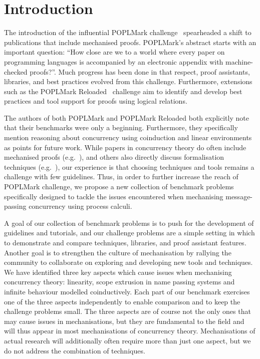 \documentclass[runningheads]{llncs}
\begin{document}
\section{Introduction}


The introduction of the influential POPLMark challenge~\cite{POPLMark}
spearheaded a shift to publications that include mechanised proofs.
POPLMark's abstract starts with an important question: ``How close are
we to a world where every paper on programming languages is
accompanied by an electronic appendix with machine- checked proofs?''.
Much progress has been done in that respect, proof assistants,
libraries, and best practices evolved from this challenge.
Furthermore, extensions such as the POPLMark
Reloaded~\cite{POPLMarkReloaded} challenge aim to identify and develop
best practices and tool support for proofs using logical relations.

The authors of both POPLMark and POPLMark Reloaded both explicitly
note that their benchmarks were only a beginning. Furthermore, they
specifically mention reasoning about concurrency using coinduction and
linear environments as points for future work. While papers in
concurrency theory do often include mechanised proofs
(e.g.~\cite{DBLP:conf/pldi/Castro-Perez0GY21,DBLP:conf/tacas/CastroFY20,lmcs:9985,
  DBLP:journals/jar/CruzFilipeMP23, Tirore:2023}), and others also
directly discuss formalisation techniques
(e.g.~\cite{DBLP:journals/jar/BengtsonPW16, DBLP:conf/tphol/Gay01,
  DBLP:conf/ppdp/Thiemann19, DBLP:conf/forte/ZalakainD21}), our
experience is that choosing techniques and tools remains a challenge
with few guidelines. Thus, in order to further increase the reach of
POPLMark challenge, we propose a new collection of benchmark problems
specifically designed to tackle the issues encountered when
mechanising message-passing concurrency using process calculi.

A goal of our collection of benchmark problems is to push for the
development of guidelines and tutorials, and our challenge problems
are a simple setting in which to demonstrate and compare techniques,
libraries, and proof assistant features. Another goal is to strengthen
the culture of mechanisation by rallying the community to collaborate
on exploring and developing new tools and techniques. We have
identified three key aspects which cause issues when mechanising
concurrency theory: linearity, scope extrusion in name passing systems
and infinite behaviour modelled coinductively. Each part of our
benchmark exercises one of the three aspects independently to enable
comparison and to keep the challenge problems small. The three aspects
are of course not the only ones that may cause issues in
mechanisations, but they are fundamental to the field and will thus
appear in most mechanisations of concurrency theory. Mechanisations of
actual research will additionally often require more than just one
aspect, but we do not address the combination of techniques.
\end{document}
